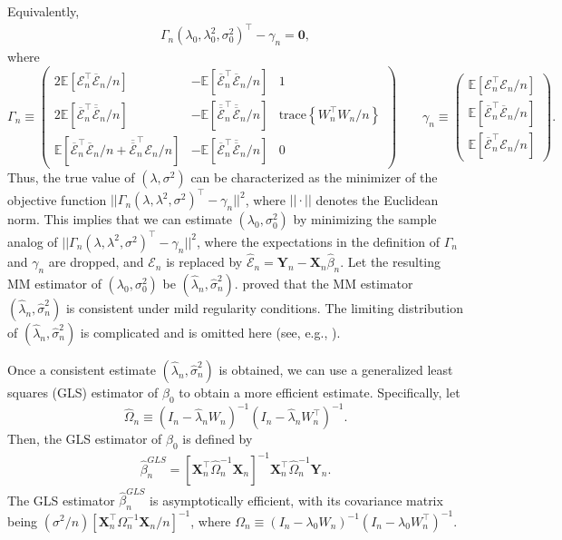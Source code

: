 \documentclass[10.5pt, A4paper, openany, uplatex]{book}
\newcommand{\mbf}{\mathbf}
\newcommand{\mcl}{\mathcal}
\newcommand{\mrm}{\mathrm}
\newcommand{\E}{\mathbb{E}}
\renewcommand{\hat}{\widehat}
\renewcommand{\bar}{\overline}
\numberwithin{equation}{section}
\begin{document}
Equivalently,
\begin{align*}
	\Gamma_n (\lambda_0, \lambda_0^2, \sigma_0^2)^\top - \gamma_n = \mbf{0},
\end{align*}
where
\[\renewcommand{\arraystretch}{1.8}
	\Gamma_n \equiv \left(
	\begin{array}{ccc}
	2 \E\left[ \mcl{E}_n^\top \bar{\mcl{E}}_n/n \right] 
	& - \E\left[ \bar{\mcl{E}}_n^\top \bar{\mcl{E}}_n/n \right] 
	& 1 \\
	2 \E\left[ \bar{\mcl{E}}_n^\top \bar{\bar{\mcl{E}}}_n/n \right] 
	& - \E\left[ \bar{\bar{\mcl{E}}}_n^\top \bar{\bar{\mcl{E}}}_n/n \right] 
	& \mrm{trace}\left\{ W_n^\top W_n/n \right\}  \\
	\E\left[ \bar{\mcl{E}}_n^\top \bar{\mcl{E}}_n/n + \bar{\bar{\mcl{E}}}_n^\top \mcl{E}_n/n\right] 
	& - \E\left[ \bar{\mcl{E}}_n^\top \bar{\bar{\mcl{E}}}_n/n \right]  
	& 0
	\end{array}
	\right)
	\qquad
	\gamma_n \equiv \left(\begin{array}{c}
	\E\left[ \mcl{E}_n^\top \mcl{E}_n /n\right] \\
	\E\left[ \bar{\mcl{E}}_n^\top \bar{\mcl{E}}_n/n \right] \\
	\E\left[ \bar{\mcl{E}}_n^\top \mcl{E}_n/n \right]
	\end{array}
	\right).
\]\renewcommand{\arraystretch}{1}
Thus, the true value of $(\lambda, \sigma^2)$ can be characterized as the minimizer of the objective function $|| \Gamma_n (\lambda, \lambda^2, \sigma^2)^\top - \gamma_n ||^2$, where $|| \cdot ||$ denotes the Euclidean norm.
This implies that we can estimate $(\lambda_0, \sigma^2_0)$ by minimizing the sample analog of $|| \Gamma_n (\lambda, \lambda^2, \sigma^2)^\top - \gamma_n ||^2$, where the expectations in the definition of $\Gamma_n$ and $\gamma_n$ are dropped, and $\mcl{E}_n$ is replaced by $\hat{\mcl{E}}_n = \mbf{Y}_n - \mbf{X}_n\hat \beta_n$.
Let the resulting MM estimator of  $(\lambda_0, \sigma^2_0)$ be $(\hat \lambda_n, \hat \sigma_n^2)$.
\cite{kelejian1999generalized} proved that the MM estimator $(\hat \lambda_n, \hat \sigma_n^2)$ is consistent under mild regularity conditions.
The limiting distribution of $(\hat \lambda_n, \hat \sigma_n^2)$ is complicated and is omitted here (see, e.g., \cite{kelejian2010specification}).
\bigskip

Once a consistent estimate $(\hat \lambda_n, \hat \sigma_n^2)$ is obtained, we can use a generalized least squares (GLS) estimator of $\beta_0$ to obtain a more efficient estimate.
Specifically, let
\[
	\hat \Omega_n \equiv (I_n - \hat \lambda_n W_n)^{-1}(I_n - \hat \lambda_n W_n^\top)^{-1} .
\]
Then, the GLS estimator of $\beta_0$ is defined by
\begin{align}\label{eq:gls}
	\hat \beta_n^{GLS} = \left[\mbf{X}_n^\top \hat \Omega_n^{-1} \mbf{X}_n \right]^{-1} \mbf{X}_n^\top \hat \Omega_n^{-1} \mbf{Y}_n.
\end{align}
The GLS estimator $\hat \beta_n^{GLS}$ is asymptotically efficient, with its covariance matrix being $ (\sigma^2/n)\left[\mbf{X}_n^\top \Omega_n^{-1} \mbf{X}_n / n \right]^{-1}$, where $\Omega_n \equiv (I_n - \lambda_0 W_n)^{-1}(I_n - \lambda_0 W_n^\top)^{-1}$.
\end{document}
